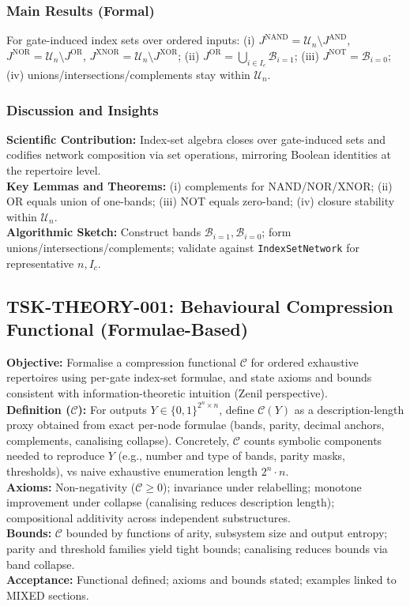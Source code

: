 \documentclass{article}
\begin{document}
\subsubsection*{Main Results (Formal)}
\begin{theorem}
For gate-induced index sets over ordered inputs: (i) \(J^{\mathrm{NAND}}=\mathcal{U}_n\setminus J^{\mathrm{AND}}\), \(J^{\mathrm{NOR}}=\mathcal{U}_n\setminus J^{\mathrm{OR}}\), \(J^{\mathrm{XNOR}}=\mathcal{U}_n\setminus J^{\mathrm{XOR}}\); (ii) \(J^{\mathrm{OR}}=\bigcup_{i\in I_c}\mathcal{B}_{i=1}\); (iii) \(J^{\mathrm{NOT}}=\mathcal{B}_{i=0}\); (iv) unions/intersections/complements stay within \(\mathcal{U}_n\).
\end{theorem}
\subsubsection*{Discussion and Insights}
\textbf{Scientific Contribution:} Index-set algebra closes over gate-induced sets and codifies network composition via set operations, mirroring Boolean identities at the repertoire level.\\
\textbf{Key Lemmas and Theorems:} (i) complements for NAND/NOR/XNOR; (ii) OR equals union of one-bands; (iii) NOT equals zero-band; (iv) closure stability within \(\mathcal{U}_n\).\\
\textbf{Algorithmic Sketch:} Construct bands \(\mathcal{B}_{i=1}, \mathcal{B}_{i=0}\); form unions/intersections/complements; validate against \texttt{IndexSetNetwork} for representative \(n,I_c\).
\subsection{TSK-THEORY-001: Behavioural Compression Functional (Formulae-Based)}
\textbf{Objective:} Formalise a compression functional \(\mathcal{C}\) for ordered exhaustive repertoires using per-gate index-set formulae, and state axioms and bounds consistent with information-theoretic intuition (Zenil perspective).\\
\textbf{Definition (\(\mathcal{C}\)):} For outputs \(Y\in\{0,1\}^{2^n\times n}\), define \(\mathcal{C}(Y)\) as a description-length proxy obtained from exact per-node formulae (bands, parity, decimal anchors, complements, canalising collapse). Concretely, \(\mathcal{C}\) counts symbolic components needed to reproduce \(Y\) (e.g., number and type of bands, parity masks, thresholds), vs naive exhaustive enumeration length \(2^n\cdot n\).\\
\textbf{Axioms:} Non-negativity (\(\mathcal{C}\ge 0\)); invariance under relabelling; monotone improvement under collapse (canalising reduces description length); compositional additivity across independent substructures.\\
\textbf{Bounds:} \(\mathcal{C}\) bounded by functions of arity, subsystem size and output entropy; parity and threshold families yield tight bounds; canalising reduces bounds via band collapse.\\
\textbf{Acceptance:} Functional defined; axioms and bounds stated; examples linked to MIXED sections.\
\end{document}
